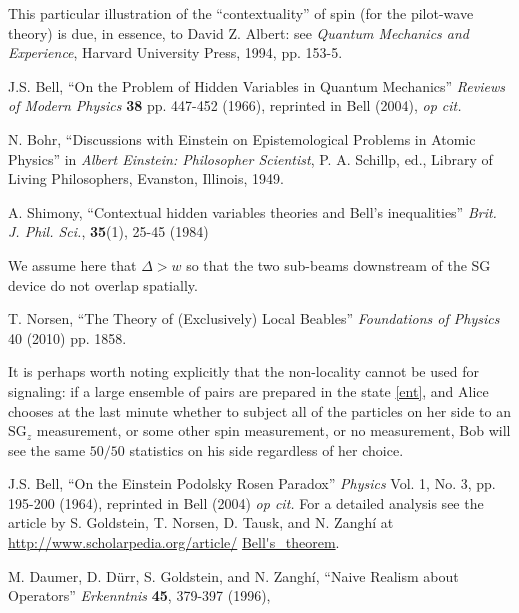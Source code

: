 \documentclass[aps,prc,onecolumn,letterpaper,floatfix,12pt]{revtex4}
\begin{document}
\begin{thebibliography}{99}
  This particular illustration of the
  ``contextuality'' of spin (for the pilot-wave theory) is due, in
  essence, to David Z. Albert:  see \emph{Quantum Mechanics and
    Experience}, Harvard University Press, 1994, pp. 153-5.


  J.S. Bell, ``On the Problem of Hidden Variables in
  Quantum Mechanics'' \emph{Reviews of Modern Physics} {\bf{38}}
  pp. 447-452 (1966), reprinted in Bell (2004), \emph{op cit.}


 N. Bohr, ``Discussions with Einstein on Epistemological
  Problems in Atomic Physics'' in \emph{Albert Einstein: Philosopher
    Scientist}, P. A. Schillp, ed., Library of Living Philosophers,
  Evanston, Illinois, 1949. 


  A. Shimony, ``Contextual hidden variables theories
  and Bell's inequalities'' \emph{Brit. J. Phil. Sci.}, {\bf{35}}(1),
  25-45 (1984)

  We assume here that $\Delta > w$ so that the two
  sub-beams downstream of the SG device do not overlap spatially.


  T. Norsen, ``The Theory of (Exclusively) Local
  Beables'' \emph{Foundations of Physics} 40 (2010) pp. 1858.

  It is perhaps worth noting explicitly that the
  non-locality cannot be used for signaling:  if a large ensemble of
  pairs are prepared in the state \eqref{ent}, and Alice chooses at
  the last minute whether to subject all of the particles on her side
  to an $\text{SG}_z$ measurement, or some other spin measurement, or
  no measurement, Bob will see the same $50/50$ statistics on his side
  regardless of her choice.  

 J.S. Bell, ``On the Einstein Podolsky Rosen Paradox''
  \emph{Physics} Vol. 1, No. 3, pp. 195-200 (1964), reprinted in Bell
  (2004) \emph{op cit.}  For a detailed analysis see the article by S. Goldstein, T. Norsen, D. Tausk,
  and N. Zangh\'i at
  \url{http://www.scholarpedia.org/article/}
\url{Bell's_theorem}.  




 M. Daumer, D. D\"urr, S. Goldstein, and N. Zangh\'i,
  ``Naive Realism about Operators'' \emph{Erkenntnis} 
{\bf{45}}, 379-397 (1996), 


\end{thebibliography}
\end{document}
